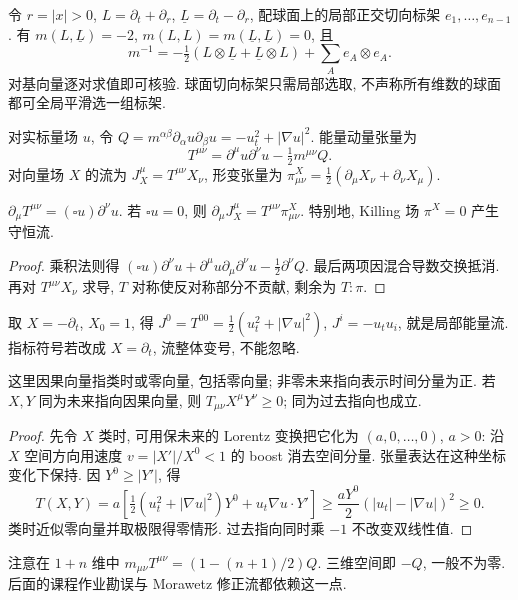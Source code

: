 令 $r=|x|>0$, $L=\partial_t+\partial_r$, $\underline L=\partial_t-\partial_r$, 配球面上的局部正交切向标架 $e_1,\ldots,e_{n-1}$. 有 $m(L,\underline L)=-2$, $m(L,L)=m(\underline L,\underline L)=0$, 且
\[
m^{-1}=-\tfrac12(L\otimes\underline L+\underline L\otimes L)+\sum_A e_A\otimes e_A.
\]
对基向量逐对求值即可核验. 球面切向标架只需局部选取, 不声称所有维数的球面都可全局平滑选一组标架.
\begin{definition}
对实标量场 $u$, 令 $Q=m^{\alpha\beta}\partial_\alpha u\partial_\beta u=-u_t^2+|\nabla u|^2$. 能量动量张量为
\[
T^{\mu\nu}=\partial^\mu u\partial^\nu u-\tfrac12m^{\mu\nu}Q.
\]
对向量场 $X$ 的流为 $J_X^\mu=T^{\mu\nu}X_\nu$, 形变张量为 $\pi^X_{\mu\nu}=\tfrac12(\partial_\mu X_\nu+\partial_\nu X_\mu)$.
\end{definition}
\begin{proposition}\label{prop:stress}
$\partial_\mu T^{\mu\nu}=(\square u)\partial^\nu u$. 若 $\square u=0$, 则 $\partial_\mu J_X^\mu=T^{\mu\nu}\pi^X_{\mu\nu}$. 特别地, Killing 场 $\pi^X=0$ 产生守恒流.
\end{proposition}
\begin{proof}
乘积法则得 $(\square u)\partial^\nu u+\partial^\mu u\partial_\mu\partial^\nu u-\tfrac12\partial^\nu Q$. 最后两项因混合导数交换抵消. 再对 $T^{\mu\nu}X_\nu$ 求导, $T$ 对称使反对称部分不贡献, 剩余为 $T:\pi$.
\end{proof}
取 $X=-\partial_t$, $X_0=1$, 得 $J^0=T^{00}=\tfrac12(u_t^2+|\nabla u|^2)$, $J^i=-u_tu_i$, 就是局部能量流. 指标符号若改成 $X=\partial_t$, 流整体变号, 不能忽略.
\begin{lemma}[主导能量正性]\label{lem:dominant}
这里因果向量指类时或零向量, 包括零向量; 非零未来指向表示时间分量为正. 若 $X,Y$ 同为未来指向因果向量, 则 $T_{\mu\nu}X^\mu Y^\nu\ge0$; 同为过去指向也成立.
\end{lemma}
\begin{proof}
先令 $X$ 类时, 可用保未来的 Lorentz 变换把它化为 $(a,0,\ldots,0)$, $a>0$: 沿 $X$ 空间方向用速度 $v=|X'|/X^0<1$ 的 boost 消去空间分量. 张量表达在这种坐标变化下保持. 因 $Y^0\ge|Y'|$, 得
\[
T(X,Y)=a\left[\tfrac12(u_t^2+|\nabla u|^2)Y^0+u_t\nabla u\cdot Y'\right]
\ge\frac{aY^0}2(|u_t|-|\nabla u|)^2\ge0.
\]
类时近似零向量并取极限得零情形. 过去指向同时乘 $-1$ 不改变双线性值.
\end{proof}
注意在 $1+n$ 维中 $m_{\mu\nu}T^{\mu\nu}=(1-(n+1)/2)Q$. 三维空间即 $-Q$, 一般不为零. 后面的课程作业勘误与 Morawetz 修正流都依赖这一点.
